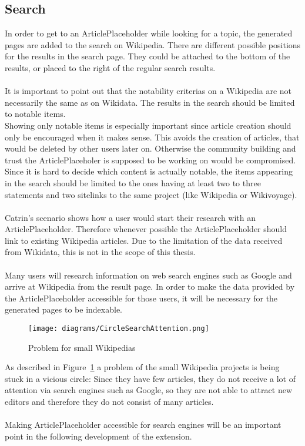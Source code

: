 \subsection{Search}
In order to get to an ArticlePlaceholder while looking for a topic, the generated pages are added to the search on Wikipedia. There are different possible positions for the results in the search page. They could be attached to the bottom of the results, or placed to the right of the regular search results. \\
\\
It is important to point out that the notability criterias on a Wikipedia are not necessarily the same as on Wikidata. The results in the search should be limited to notable items. \\
Showing only notable items is especially important since article creation should only be encouraged when it makes sense. This avoids the creation of articles, that would be deleted by other users later on. Otherwise the community building and trust the ArticlePlaceholer is supposed to be working on would be compromised. \\
Since it is hard to decide which content is actually notable, the items appearing in the search should be limited to the ones having at least two to three statements and two sitelinks to the same project (like Wikipedia or Wikivoyage). \\
\\
Catrin's scenario shows how a user would start their research with an ArticlePlaceholder. Therefore whenever possible the ArticlePlaceholder should link to existing Wikipedia articles. Due to the limitation of the data received from Wikidata, this is not in the scope of this thesis. \\
\\
Many users will research information on web search engines such as Google and arrive at Wikipedia from the result page. In order to make the data provided by the ArticlePlaceholder accessible for those users, it will be necessary for the generated pages to be indexable.
\begin{figure}[H]
	\centering
	\texttt{[image: diagrams/CircleSearchAttention.png]}
	\caption{Problem for small Wikipedias}
	\label{fig:CircleSearch}
\end{figure}
As described in Figure~\ref{fig:CircleSearch} a problem of the small Wikipedia projects is being stuck in a vicious circle: Since they have few articles, they do not receive a lot of attention via search engines such as Google, so they are not able to attract new editors and therefore they do not consist of many articles. \\
\\
Making ArticlePlaceholder accessible for search engines will be an important point in the following development of the extension. 

